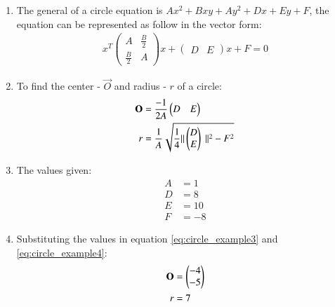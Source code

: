 \renewcommand{\theequation}{\theenumi}
\begin{enumerate}[label=\thesubsection.\arabic*.,ref=\thesubsection.\theenumi]

\item \solution The general of a circle equation is $Ax^2 + Bxy + Ay^2 + Dx + Ey + F$, the equation can be represented as follow in the vector form:
\begin{align}
x^T 
\begin{pmatrix}
A & \frac{B}{2} \\
\frac{B}{2} & A
\end{pmatrix}
x + 
\begin{pmatrix}
D & E 
\end{pmatrix}
x + F = 0
\end{align}

\item To find the center - $\vec{O}$ and radius - $r$ of a circle:
\begin{align}
\mathbf{O} &= \frac{-1}{2A}\begin{pmatrix}
D & E 
\end{pmatrix}\label{eq:circle_example3}\\
r &= \frac{1}{A}\sqrt{ \frac{1}{4} \| \begin{pmatrix}D\\ E\end{pmatrix}\ \|^2 - F^2}\label{eq:circle_example4}
\end{align}

\item The values given:
\begin{align}
A &= 1\\
D &= 8 \\
E &= 10 \\
F &= -8
\end{align}

\item Substituting the values in equation \ref{eq:circle_example3} and \ref{eq:circle_example4}:
\begin{align}
\mathbf{O} &= \begin{pmatrix}-4\\-5\end{pmatrix}\\
r &= 7
\end{align} 


\end{enumerate}
